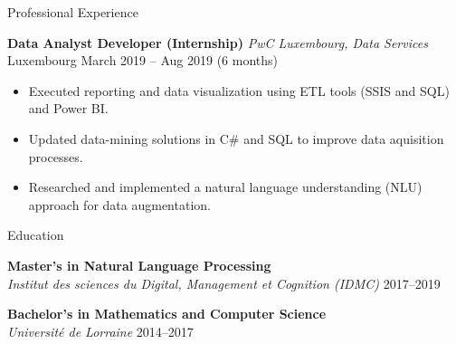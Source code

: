 \documentclass{resume} %
\begin{document}
\begin{rSection}{Professional Experience}
\vspace{0.1cm}

\textbf{Data Analyst Developer (Internship)} \hfill \textit{PwC Luxembourg, Data Services} \\
Luxembourg \hfill March 2019 -- Aug 2019 (6 months)
\begin{itemize}
    \item Executed reporting and data visualization using ETL tools (SSIS and SQL) and Power BI.
    \item Updated data-mining solutions in C\# and SQL to improve data aquisition processes.
    \item Researched and implemented a natural language understanding (NLU) approach for data augmentation.
\end{itemize}

\end{rSection}

\begin{rSection}{Education}

\textbf{Master's in Natural Language Processing} \\
\textit{Institut des sciences du Digital, Management et Cognition (IDMC)} \hfill 2017--2019

\textbf{Bachelor's in Mathematics and Computer Science} \\
\textit{Université de Lorraine} \hfill 2014--2017 \\
\end{rSection}
\end{document}
